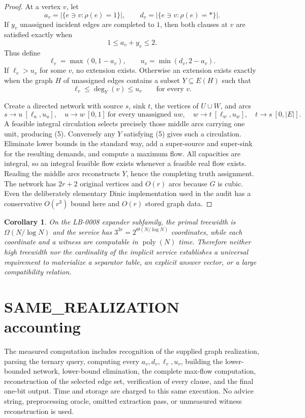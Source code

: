\documentclass[11pt]{article}
\newtheorem{corollary}{Corollary}
\begin{document}
\begin{proof}
At a vertex \(v\), let
\[
 a_v=\bigl|\{e\ni v:\rho(e)=1\}\bigr|,\qquad
 d_v=\bigl|\{e\ni v:\rho(e)=*\}\bigr|.
\]
If \(y_v\) unassigned incident edges are completed to \(1\), then both clauses
at \(v\) are satisfied exactly when
\[
 1\le a_v+y_v\le 2.
\]
Thus define
\[
 \ell_v=\max(0,1-a_v),\qquad
 u_v=\min(d_v,2-a_v).
\tag{4}
\]
If \(\ell_v>u_v\) for some \(v\), no extension exists. Otherwise an extension
exists exactly when the graph \(H\) of unassigned edges contains a subset
\(Y\subseteq E(H)\) such that
\[
 \ell_v\le \deg_Y(v)\le u_v\qquad\text{for every }v.
\tag{5}
\]

Create a directed network with source \(s\), sink \(t\), the vertices of
\(U\cup W\), and arcs
\[
 s\to u\ [\ell_u,u_u],\quad
 u\to w\ [0,1]\ \text{for every unassigned }uw,\quad
 w\to t\ [\ell_w,u_w],\quad
 t\to s\ [0,|E|].
\tag{6}
\]
A feasible integral circulation selects precisely those middle arcs carrying
one unit, producing (5). Conversely any \(Y\) satisfying (5) gives such a
circulation. Eliminate lower bounds in the standard way, add a super-source
and super-sink for the resulting demands, and compute a maximum flow. All
capacities are integral, so an integral feasible flow exists whenever a
feasible real flow exists. Reading the middle arcs reconstructs \(Y\), hence
the completing truth assignment. The network has \(2r+2\) original vertices
and \(O(r)\) arcs because \(G\) is cubic. Even the deliberately elementary
Dinic implementation used in the audit has a conservative \(O(r^3)\) bound
here and \(O(r)\) stored graph data.
\end{proof}

\begin{corollary}
On the LB-0008 expander subfamily, the primal treewidth is
\(\Omega(N/\log N)\) and the service has
\(3^{3r}=2^{\Theta(N/\log N)}\) coordinates, while each coordinate and a
witness are computable in \(\operatorname{poly}(N)\) time. Therefore neither
high treewidth nor the cardinality of the implicit service establishes a
universal requirement to materialize a separator table, an explicit answer
vector, or a large compatibility relation.
\end{corollary}

\section{SAME\_REALIZATION accounting}

The measured computation includes recognition of the supplied graph
realization, parsing the ternary query, computing every \(a_v,d_v,\ell_v,u_v\),
building the lower-bounded network, lower-bound elimination, the complete
max-flow computation, reconstruction of the selected edge set, verification
of every clause, and the final one-bit output. Time and storage are charged to
this same execution. No advice string, preprocessing oracle, omitted
extraction pass, or unmeasured witness reconstruction is used.
\end{document}

